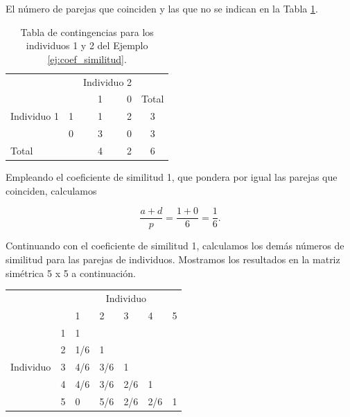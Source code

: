 \documentclass[a4paper, 20pt]{article}
\begin{document}
El número de parejas que coinciden y las que no se indican en la Tabla \ref{tab:contingencias-ej}.

\begin{table}[h]
  \centering
  \caption{Tabla de contingencias para los individuos 1 y 2 del Ejemplo \ref{ej:coef_similitud}.}
  \label{tab:contingencias-ej}
\resizebox{6.5cm}{!} {
  \begin{tabular}{lrrrrr}
    \toprule
\multicolumn{2}{l}{\multirow{2}{*}{}} & \multicolumn{2}{c}{Individuo 2} & \\\cmidrule{3-4}
\multicolumn{2}{l}{}                  & 1        &   0       & \multicolumn{2}{c}{Total}                        \\ \midrule
Individuo 1      & 1      & 1        &  2       & \multicolumn{2}{c}{3}                     \\
                              & 0      & 3        &    0       & \multicolumn{2}{c}{3}                     \\ \midrule
\multicolumn{2}{l}{Total}            & 4     & 2     & \multicolumn{2}{c}{6}\\
\bottomrule
\end{tabular}
}
\end{table}

Empleando el coeficiente de similitud 1, que pondera por igual las parejas que coinciden, calculamos

$$\frac{a+d}{p}=\frac{1+0}{6}=\frac{1}{6}. $$

Continuando con el coeficiente de similitud 1, calculamos los demás números de similitud para las parejas de individuos. Mostramos los resultados en la matriz simétrica 5 x 5 a continuación.

\begin{table}[H]
\centering
\resizebox{7.5cm}{!} {
\begin{tabular}{lllllll}
\multicolumn{2}{l}{\multirow{2}{*}{}}               & \multicolumn{5}{c}{Individuo}                  \\
\multicolumn{2}{l}{}                                & 1   & 2   & 3   & 4   & 5                      \\ \cline{3-3} \cline{7-7} 
\multirow{5}{*}{Individuo} & \multicolumn{1}{l|}{1} & 1   &     &     &     & \multicolumn{1}{l|}{}  \\
                           & \multicolumn{1}{l|}{2} & 1/6 & 1   &     &     & \multicolumn{1}{l|}{}  \\
                           & \multicolumn{1}{l|}{3} & 4/6 & 3/6 & 1   &     & \multicolumn{1}{l|}{}  \\
                           & \multicolumn{1}{l|}{4} & 4/6 & 3/6 & 2/6 & 1   & \multicolumn{1}{l|}{}  \\
                           & \multicolumn{1}{l|}{5} & 0   & 5/6 & 2/6 & 2/6 & \multicolumn{1}{l|}{1} \\ \cline{3-3} \cline{7-7} 
\end{tabular}
}
\end{table}
\end{document}
